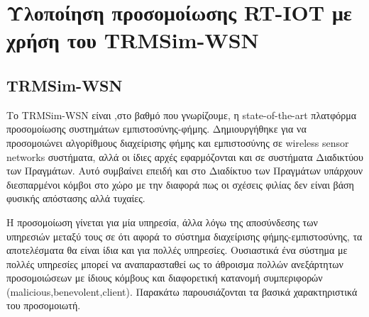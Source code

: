\chapter{Υλοποίηση προσομοίωσης RT-IOT με χρήση του TRMSim-WSN}\label{ch:implementation}

\section{TRMSim-WSN}


Το TRMSim-WSN \cite{TRMSim}
 είναι ,στο βαθμό που γνωρίζουμε, η state-of-the-art πλατφόρμα προσομοίωσης συστημάτων εμπιστοσύνης-φήμης. Δημιουργήθηκε για να προσομοιώνει αλγορίθμους διαχείρισης φήμης και εμπιστοσύνης σε wireless sensor networks συστήματα, αλλά οι ίδιες αρχές εφαρμόζονται και σε συστήματα Διαδικτύου των Πραγμάτων.
 Αυτό συμβαίνει επειδή και στο Διαδίκτυο των Πραγμάτων υπάρχουν διεσπαρμένοι κόμβοι στο χώρο με την διαφορά πως οι σχέσεις φιλίας δεν είναι βάση φυσικής απόστασης αλλά τυχαίες. 
 
 Η προσομοίωση γίνεται για μία υπηρεσία, άλλα λόγω της αποσύνδεσης των υπηρεσιών μεταξύ τους σε ότι αφορά το σύστημα διαχείρισης φήμης-εμπιστοσύνης, τα αποτελέσματα θα είναι ίδια και για πολλές υπηρεσίες. Ουσιαστικά ένα σύστημα με πολλές υπηρεσίες μπορεί να αναπαρασταθεί ως το άθροισμα πολλών ανεξάρτητων προσομοιώσεων με ίδιους κόμβους και διαφορετική κατανομή συμπεριφορών (malicious,benevolent,client). Παρακάτω παρουσιάζονται τα βασικά χαρακτηριστικά του προσομοιωτή.
 \newpage
 
 
 
